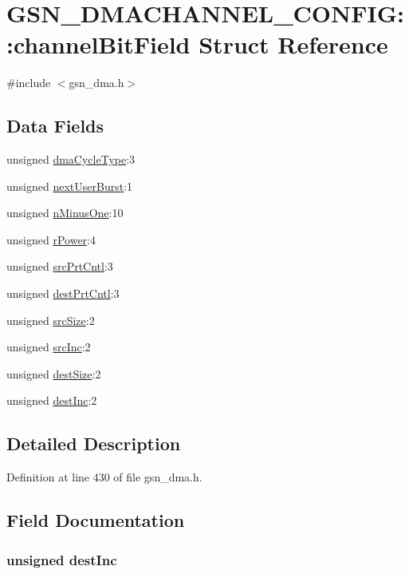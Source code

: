 \hypertarget{a00010}{
\section{GSN\_\-DMACHANNEL\_\-CONFIG::channelBitField Struct Reference}
\label{a00010}
}


{\ttfamily \#include $<$gsn\_\-dma.h$>$}

\subsection*{Data Fields}
\begin{DoxyCompactItemize}
\item 
unsigned \hyperlink{a00010_ae69ce6e8dfe9814fb31e178b5546c5a6}{dmaCycleType}:3
\item 
unsigned \hyperlink{a00010_a8e1f4cf765fd48852d2bb9ec9d53aecb}{nextUserBurst}:1
\item 
unsigned \hyperlink{a00010_a99a15fbf9028054f574971dfad66c509}{nMinusOne}:10
\item 
unsigned \hyperlink{a00010_a5081ca949958e3fbaebc85135819780f}{rPower}:4
\item 
unsigned \hyperlink{a00010_a9da9c5720e6716d6fa842be05526a7d2}{srcPrtCntl}:3
\item 
unsigned \hyperlink{a00010_a83b15af9367ba0a3f4604e91350d9d5f}{destPrtCntl}:3
\item 
unsigned \hyperlink{a00010_afce65d7ab2f64da1bc1b369379fb5e67}{srcSize}:2
\item 
unsigned \hyperlink{a00010_a3631bf2dd4fae5ac6eb96d8290a646aa}{srcInc}:2
\item 
unsigned \hyperlink{a00010_a7345657a73f4a83ac79a7433da10cabd}{destSize}:2
\item 
unsigned \hyperlink{a00010_a85185314ac4056c159e41d8402a79a8b}{destInc}:2
\end{DoxyCompactItemize}


\subsection{Detailed Description}


Definition at line 430 of file gsn\_\-dma.h.



\subsection{Field Documentation}
\hypertarget{a00010_a85185314ac4056c159e41d8402a79a8b}{
\subsubsection[{destInc}]{\setlength{\rightskip}{0pt plus 5cm}unsigned {\bf destInc}}}
\label{a00010_a85185314ac4056c159e41d8402a79a8b}


